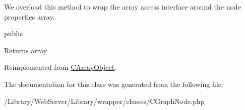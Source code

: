 We overload this method to wrap the array access interface around the node properties array.

public \begin{DoxyReturn}{Returns}
array 
\end{DoxyReturn}


Reimplemented from \hyperlink{class_c_array_object_a1f29fcc343a624354f6096fd6a4621e6}{C\-Array\-Object}.



The documentation for this class was generated from the following file\-:\begin{DoxyCompactItemize}
\item 
/\-Library/\-Web\-Server/\-Library/wrapper/classes/C\-Graph\-Node.\-php\end{DoxyCompactItemize}
